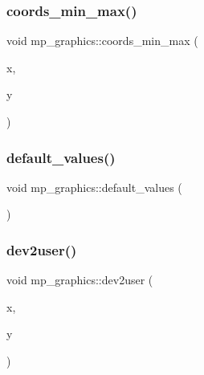 \mbox{\label{classmp__graphics_afa0af74da2afd1d00b2eeb5e25b4f596}} 
\subsubsection{\texorpdfstring{coords\+\_\+min\+\_\+max()}{coords\_min\_max()}}
{\footnotesize\ttfamily void mp\+\_\+graphics\+::coords\+\_\+min\+\_\+max (\begin{DoxyParamCaption}\item[{\mbox{\hyperlink{galois_8h_a09fddde158a3a20bd2dcadb609de11dc}{I\+NT}}}]{x,  }\item[{\mbox{\hyperlink{galois_8h_a09fddde158a3a20bd2dcadb609de11dc}{I\+NT}}}]{y }\end{DoxyParamCaption})}

\mbox{\label{classmp__graphics_a7d407ae5a4cc589826f44e307e654bab}} 
\subsubsection{\texorpdfstring{default\+\_\+values()}{default\_values()}}
{\footnotesize\ttfamily void mp\+\_\+graphics\+::default\+\_\+values (\begin{DoxyParamCaption}{ }\end{DoxyParamCaption})}

\mbox{\label{classmp__graphics_ad2f2f2f85200867d9ab52d1660e79bf1}} 
\subsubsection{\texorpdfstring{dev2user()}{dev2user()}}
{\footnotesize\ttfamily void mp\+\_\+graphics\+::dev2user (\begin{DoxyParamCaption}\item[{\mbox{\hyperlink{galois_8h_a09fddde158a3a20bd2dcadb609de11dc}{I\+NT}} \&}]{x,  }\item[{\mbox{\hyperlink{galois_8h_a09fddde158a3a20bd2dcadb609de11dc}{I\+NT}} \&}]{y }\end{DoxyParamCaption})}

